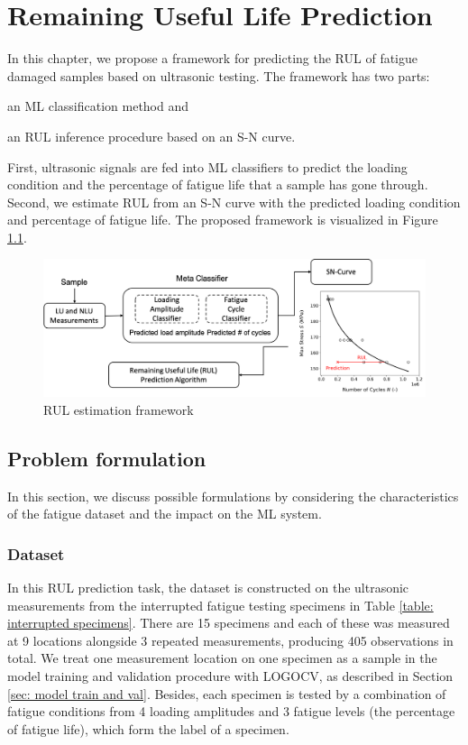 \chapter{Remaining Useful Life Prediction}
\label{chap: rul}

In this chapter, we propose a framework for predicting the RUL of fatigue damaged samples based on ultrasonic testing. The framework has two parts: \begin{enumerate*}[label=(\alph*)]
    \item an ML classification method and
    \item an RUL inference procedure based on an S-N curve.
\end{enumerate*}  First, ultrasonic signals are fed into ML classifiers to predict the loading condition and the percentage of fatigue life that a sample has gone through. Second, we estimate RUL from an S-N curve with the predicted loading condition and percentage of fatigue life. The proposed framework is visualized in Figure \ref{fig: rul framework}.

\begin{figure}
    \centering
    \includegraphics[width=\linewidth]{fig/rul_framework.png}
    \caption{RUL estimation framework}
    \label{fig: rul framework}
\end{figure}

\section{Problem formulation}
\label{sec: rul prob formulation}
In this section, we discuss possible formulations by considering the characteristics of the fatigue dataset and the impact on the ML system.

\subsection{Dataset}
In this RUL prediction task, the dataset is constructed on the ultrasonic measurements from the interrupted fatigue testing specimens in Table \ref{table: interrupted specimens}. There are 15 specimens and each of these was measured at 9 locations alongside 3 repeated measurements, producing 405 observations in total. We treat one measurement location on one specimen as a sample in the model training and validation procedure with LOGOCV, as described in Section \ref{sec: model train and val}. Besides, each specimen is tested by a combination of fatigue conditions from 4 loading amplitudes and 3 fatigue levels (the percentage of fatigue life), which form the label of a specimen.

